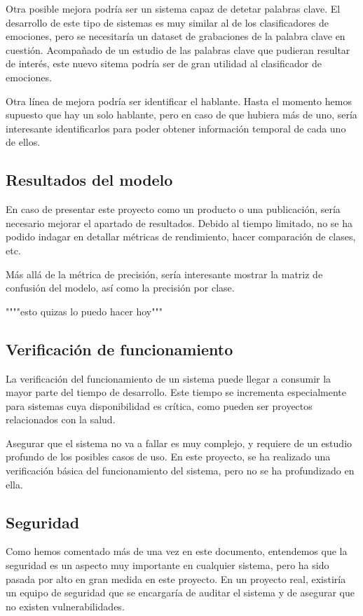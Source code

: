 Otra posible mejora podría ser un sistema capaz de detetar palabras clave. 
El desarrollo de este tipo de sistemas es muy similar al de los clasificadores de emociones, pero se necesitaría un dataset de grabaciones de la palabra clave en cuestión.
Acompañado de un estudio de las palabras clave que pudieran resultar de interés, este nuevo sitema podría ser de gran utilidad al clasificador de emociones.

Otra línea de mejora podría ser identificar el hablante.
Hasta el momento hemos supuesto que hay un solo hablante, pero en caso de que hubiera más de uno, sería interesante identificarlos para poder obtener información temporal de cada uno de ellos.


\subsection{Resultados del modelo}
En caso de presentar este proyecto como un producto o una publicación, sería necesario mejorar el apartado de resultados.
Debido al tiempo limitado, no se ha podido indagar en detallar métricas de rendimiento, hacer comparación de clases, etc.

Más allá de la métrica de precisión, sería interesante mostrar la matriz de confusión del modelo, así como la precisión por clase.

""""esto quizas lo puedo hacer hoy"""

\subsection{Verificación de funcionamiento}
La verificación del funcionamiento de un sistema puede llegar a consumir la mayor parte del tiempo de desarrollo.
Este tiempo se incrementa especialmente para sistemas cuya disponibilidad es crítica, como pueden ser proyectos relacionados con la salud.

Asegurar que el sistema no va a fallar es muy complejo, y requiere de un estudio profundo de los posibles casos de uso.
En este proyecto, se ha realizado una verificación básica del funcionamiento del sistema, pero no se ha profundizado en ella.


\subsection{Seguridad}
Como hemos comentado más de una vez en este documento, entendemos que la seguridad es un aspecto muy importante en cualquier sistema, pero ha sido pasada por alto en gran medida en este proyecto.
En un proyecto real, existiría un equipo de seguridad que se encargaría de auditar el sistema y de asegurar que no existen vulnerabilidades.

